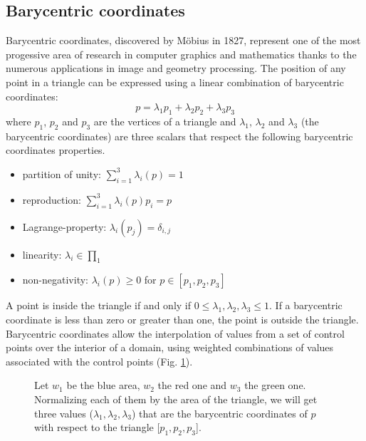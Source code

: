 \subsection{Barycentric coordinates}\label{section:barycentric-coord}
Barycentric coordinates, discovered by M\"obius in 1827, represent one of the most progessive area of research in computer graphics and mathematics thanks to the numerous applications in image and geometry processing.
\cite{REPORT:localbarycentricoordsepfl}
The position of any point in a triangle can be expressed using a linear combination of barycentric coordinates:
$$ p = \lambda_1 p_1 + \lambda_2 p_2 + \lambda_3 p_3$$
where $p_1$, $p_2$ and $p_3$ are the vertices of a triangle and $\lambda_1$, $\lambda_2$ and $\lambda_3$ (the barycentric coordinates) are three scalars that
respect the following barycentric coordinates properties.\cite{SLIDE:ICORSI}
\begin{itemize}
  \item partition of unity: $\sum_{i=1}^3 \lambda_{i}(p) = 1$
  \item reproduction: $\sum_{i=1}^3 \lambda_{i}(p)p_i = p$
  \item Lagrange-property: $\lambda_i(p_j) = \delta_{i, j}$
  \item linearity: $\lambda_i \in \prod_1$
  \item non-negativity: $\lambda_i(p)\geq 0$ for $p \in [p_1, p_2, p_3]$
\end{itemize}

A point is inside the triangle if and only if $0 \leq \lambda_1, \lambda_2, \lambda_3 \leq 1$. If a barycentric coordinate is less than zero or greater than one, the point is outside the triangle.
Barycentric coordinates allow the interpolation of values from a set of control points over the interior of a domain, using weighted combinations of values associated with the control points (Fig. \ref{fig:barycentric-coord}).
\cite{REPORT:localbarycentricoordsepfl}
\begin{figure}[h!]
  \centering
    \caption{Let $w_1$ be the blue area, $w_2$ the red one and $w_3$ the green one. Normalizing each of them by the area of the triangle, we will get three values ($\lambda_1, \lambda_2, \lambda_3$) that are the barycentric coordinates of $p$ with respect to the triangle [$p_1, p_2, p_3$].}
    \label{fig:barycentric-coord}
  \end{figure}

